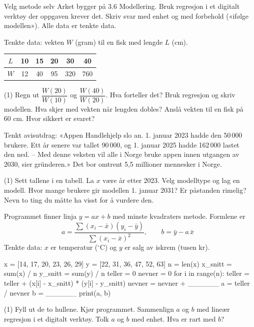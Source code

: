 
\begin{infoboks}{Velg metode selv}
Arket bygger på 3.6 Modellering. Bruk regresjon i et digitalt verktøy der oppgaven krever det.
Skriv svar med enhet og med forbehold («ifølge modellen»). Alle data er tenkte data.
\end{infoboks}


Tenkte data: vekten $W$ (gram) til en fisk med lengde $L$ (cm).

\smallskip
\begin{tabular}{@{}c|ccccc@{}}
$L$ & 10 & 15 & 20 & 30 & 40\\ \hline
$W$ & 12 & 40 & 95 & 320 & 760\\
\end{tabular}

\begin{tasks}(1)
  \task Regn ut $\dfrac{W(20)}{W(10)}$ og $\dfrac{W(40)}{W(20)}$. Hva forteller det?
  \task Bruk regresjon og skriv modellen.
  \task Hva skjer med vekten når lengden dobles?
  \task Anslå vekten til en fisk på 60 cm. Hvor sikkert er svaret?
\end{tasks}

Tenkt avisutdrag: «Appen Handlehjelp slo an. 1. januar 2023 hadde den 50\,000 brukere. Ett år senere var tallet 90\,000, og 1. januar 2025 hadde 162\,000 lastet den ned.
– Med denne veksten vil alle i Norge bruke appen innen utgangen av 2030, sier gründeren.» Det bor omtrent 5,5 millioner mennesker i Norge.
\begin{tasks}(1)
  \task Sett tallene i en tabell. La $x$ være år etter 2023.
  \task Velg modelltype og lag en modell.
  \task Hvor mange brukere gir modellen 1. januar 2031?
  \task Er påstanden rimelig? Nevn to ting du måtte ha visst for å vurdere den.
\end{tasks}

Programmet finner linja $y = ax + b$ med minste kvadraters metode. Formlene er
\[ a = \frac{\sum (x_i - \bar x)(y_i - \bar y)}{\sum (x_i - \bar x)^2}, \qquad b = \bar y - a\,\bar x \]
Tenkte data: $x$ er temperatur ($^\circ$C) og $y$ er salg av iskrem (tusen kr).
\begin{kode}
x = [14, 17, 20, 23, 26, 29]
y = [22, 31, 36, 47, 52, 63]
n = len(x)
x_snitt = sum(x) / n
y_snitt = sum(y) / n
teller = 0
nevner = 0
for i in range(n):
    teller = teller + (x[i] - x_snitt) * (y[i] - y_snitt)
    nevner = nevner + ______
a = teller / nevner
b = ______
print(a, b)
\end{kode}
\begin{tasks}(1)
  \task Fyll ut de to hullene.
  \task Kjør programmet. Sammenlign $a$ og $b$ med lineær regresjon i et digitalt verktøy.
  \task Tolk $a$ og $b$ med enhet. Hva er rart med $b$?
\end{tasks}

